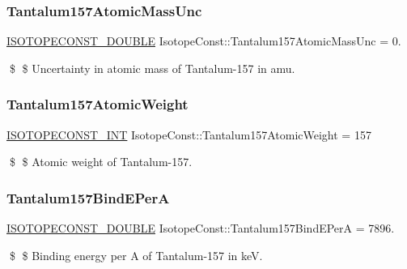 \subsubsection{\texorpdfstring{Tantalum157\+Atomic\+Mass\+Unc}{Tantalum157AtomicMassUnc}}
{\footnotesize\ttfamily \mbox{\hyperlink{group___isotope_const-_macros_ga8f45a7272ce02c0b4c65c44636ed719a}{I\+S\+O\+T\+O\+P\+E\+C\+O\+N\+S\+T\+\_\+\+D\+O\+U\+B\+LE}} Isotope\+Const\+::\+Tantalum157\+Atomic\+Mass\+Unc = 0.}

\$ \$ Uncertainty in atomic mass of Tantalum-\/157 in amu. \mbox{\label{group___isotope_const-_tantalum-_ta157_ga21258650153b5c6cf38ac8441655fb80}} 
\subsubsection{\texorpdfstring{Tantalum157\+Atomic\+Weight}{Tantalum157AtomicWeight}}
{\footnotesize\ttfamily \mbox{\hyperlink{group___isotope_const-_macros_ga5f18360b3e99483a35c32d789e62621c}{I\+S\+O\+T\+O\+P\+E\+C\+O\+N\+S\+T\+\_\+\+I\+NT}} Isotope\+Const\+::\+Tantalum157\+Atomic\+Weight = 157}

\$ \$ Atomic weight of Tantalum-\/157. \mbox{\label{group___isotope_const-_tantalum-_ta157_ga64440514bdc273be2f2912e528681b5a}} 
\subsubsection{\texorpdfstring{Tantalum157\+Bind\+E\+PerA}{Tantalum157BindEPerA}}
{\footnotesize\ttfamily \mbox{\hyperlink{group___isotope_const-_macros_ga8f45a7272ce02c0b4c65c44636ed719a}{I\+S\+O\+T\+O\+P\+E\+C\+O\+N\+S\+T\+\_\+\+D\+O\+U\+B\+LE}} Isotope\+Const\+::\+Tantalum157\+Bind\+E\+PerA = 7896.}

\$ \$ Binding energy per A of Tantalum-\/157 in keV. \mbox{\label{group___isotope_const-_tantalum-_ta157_ga64e5f58a3a8890654372a18c8dce97e4}} 
